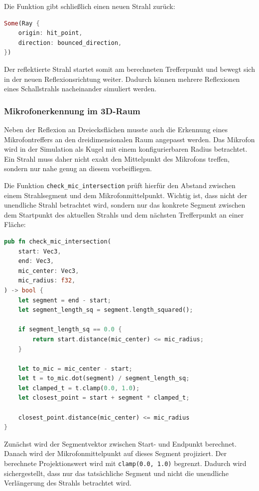 Die Funktion gibt schließlich einen neuen Strahl zurück:

\begin{lstlisting}[language=Rust]
Some(Ray {
    origin: hit_point,
    direction: bounced_direction,
})
\end{lstlisting}

Der reflektierte Strahl startet somit am berechneten Trefferpunkt und bewegt
sich in der neuen Reflexionsrichtung weiter. Dadurch können mehrere Reflexionen
eines Schallstrahls nacheinander simuliert werden.

\subsubsection{Mikrofonerkennung im 3D-Raum}
\label{subsubsec:3d_microphone}

Neben der Reflexion an Dreiecksflächen musste auch die Erkennung eines
Mikrofontreffers an den dreidimensionalen Raum angepasst werden. Das Mikrofon
wird in der Simulation als Kugel mit einem konfigurierbaren Radius betrachtet.
Ein Strahl muss daher nicht exakt den Mittelpunkt des Mikrofons treffen, sondern
nur nahe genug an diesem vorbeifliegen.

Die Funktion \texttt{check\_mic\_intersection} prüft hierfür den Abstand
zwischen einem Strahlsegment und dem Mikrofonmittelpunkt. Wichtig ist, dass
nicht der unendliche Strahl betrachtet wird, sondern nur das konkrete Segment
zwischen dem Startpunkt des aktuellen Strahls und dem nächsten Trefferpunkt an
einer Fläche:

\begin{lstlisting}[language=Rust]
pub fn check_mic_intersection(
    start: Vec3,
    end: Vec3,
    mic_center: Vec3,
    mic_radius: f32,
) -> bool {
    let segment = end - start;
    let segment_length_sq = segment.length_squared();

    if segment_length_sq == 0.0 {
        return start.distance(mic_center) <= mic_radius;
    }

    let to_mic = mic_center - start;
    let t = to_mic.dot(segment) / segment_length_sq;
    let clamped_t = t.clamp(0.0, 1.0);
    let closest_point = start + segment * clamped_t;

    closest_point.distance(mic_center) <= mic_radius
}
\end{lstlisting}

Zunächst wird der Segmentvektor zwischen Start- und Endpunkt berechnet. Danach
wird der Mikrofonmittelpunkt auf dieses Segment projiziert. Der berechnete
Projektionswert wird mit \texttt{clamp(0.0, 1.0)} begrenzt. Dadurch wird
sichergestellt, dass nur das tatsächliche Segment und nicht die unendliche
Verlängerung des Strahls betrachtet wird.

